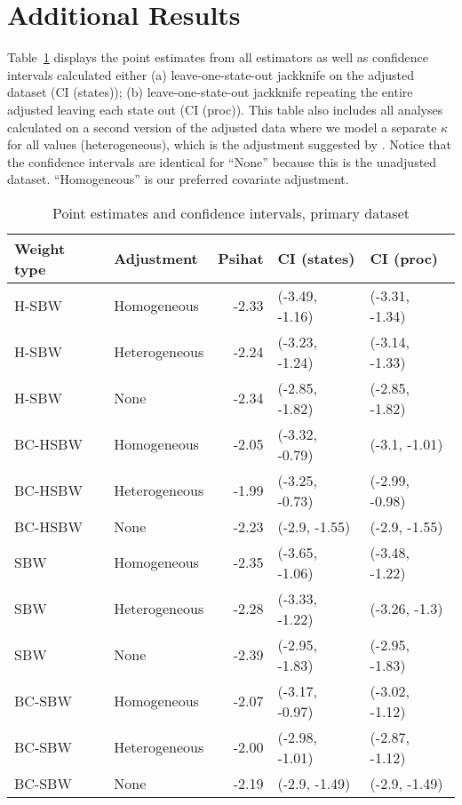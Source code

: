 \section{Additional Results}
\label{ssec:allresults}

Table~\ref{tab:confintmain} displays the point estimates from all estimators as well as confidence intervals calculated either (a) leave-one-state-out jackknife on the adjusted dataset (CI (states)); (b) leave-one-state-out jackknife repeating the entire adjusted leaving each state out (CI (proc)). This table also includes all analyses calculated on a second version of the adjusted data where we model a separate $\kappa$ for all values (heterogeneous), which is the adjustment suggested by \cite{carroll2006measurement}. Notice that the confidence intervals are identical for ``None'' because this is the unadjusted dataset. ``Homogeneous'' is our preferred covariate adjustment.

\begin{table}[ht]
\centering
\caption{Point estimates and confidence intervals, primary dataset}
\label{tab:confintmain}
\begin{tabular}{llrll}
  \hline
Weight type & Adjustment & Psihat & CI (states) & CI (proc) \\ 
  \hline
H-SBW & Homogeneous & -2.33 & (-3.49, -1.16) & (-3.31, -1.34) \\ 
  H-SBW & Heterogeneous & -2.24 & (-3.23, -1.24) & (-3.14, -1.33) \\ 
  H-SBW & None & -2.34 & (-2.85, -1.82) & (-2.85, -1.82) \\ 
  BC-HSBW & Homogeneous & -2.05 & (-3.32, -0.79) & (-3.1, -1.01) \\ 
  BC-HSBW & Heterogeneous & -1.99 & (-3.25, -0.73) & (-2.99, -0.98) \\ 
  BC-HSBW & None & -2.23 & (-2.9, -1.55) & (-2.9, -1.55) \\ 
  SBW & Homogeneous & -2.35 & (-3.65, -1.06) & (-3.48, -1.22) \\ 
  SBW & Heterogeneous & -2.28 & (-3.33, -1.22) & (-3.26, -1.3) \\ 
  SBW & None & -2.39 & (-2.95, -1.83) & (-2.95, -1.83) \\ 
  BC-SBW & Homogeneous & -2.07 & (-3.17, -0.97) & (-3.02, -1.12) \\ 
  BC-SBW & Heterogeneous & -2.00 & (-2.98, -1.01) & (-2.87, -1.12) \\ 
  BC-SBW & None & -2.19 & (-2.9, -1.49) & (-2.9, -1.49) \\ 
   \hline
\end{tabular}
\end{table}

